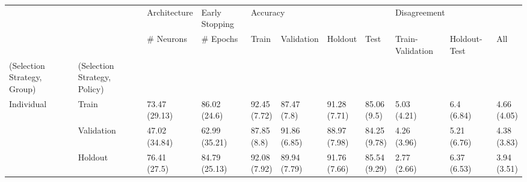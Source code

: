 \begin{table}
\centering
\label{tab:single_sets}
\begin{tabular}{lllllllllll}
\toprule
       &      &   Architecture & Early Stopping & \multicolumn{4}{l}{Accuracy} & \multicolumn{3}{l}{Disagreement} \\
       &      &      \# Neurons &       \# Epochs &         Train &    Validation &       Holdout &          Test & Train-Validation & Holdout-Test &          All \\
(Selection Strategy, Group) & (Selection Strategy, Policy) &                &                &               &               &               &               &                  &              &              \\
\midrule
Individual & Train &  \makecell{73.47\\(29.13)} &   \makecell{86.02\\(24.6)} &  \makecell{92.45\\(7.72)} &   \makecell{87.47\\(7.8)} &  \makecell{91.28\\(7.71)} &   \makecell{85.06\\(9.5)} &      \makecell{5.03\\(4.21)} &   \makecell{6.4\\(6.84)} &  \makecell{4.66\\(4.05)} \\
       & Validation &  \makecell{47.02\\(34.84)} &  \makecell{62.99\\(35.21)} &   \makecell{87.85\\(8.8)} &  \makecell{91.86\\(6.85)} &  \makecell{88.97\\(7.98)} &  \makecell{84.25\\(9.78)} &      \makecell{4.26\\(3.96)} &  \makecell{5.21\\(6.76)} &  \makecell{4.38\\(3.83)} \\
       & Holdout &   \makecell{76.41\\(27.5)} &  \makecell{84.79\\(25.13)} &  \makecell{92.08\\(7.92)} &  \makecell{89.94\\(7.79)} &  \makecell{91.76\\(7.66)} &  \makecell{85.54\\(9.29)} &      \makecell{2.77\\(2.66)} &  \makecell{6.37\\(6.53)} &  \makecell{3.94\\(3.51)} \\

\end{tabular}
\end{table}
